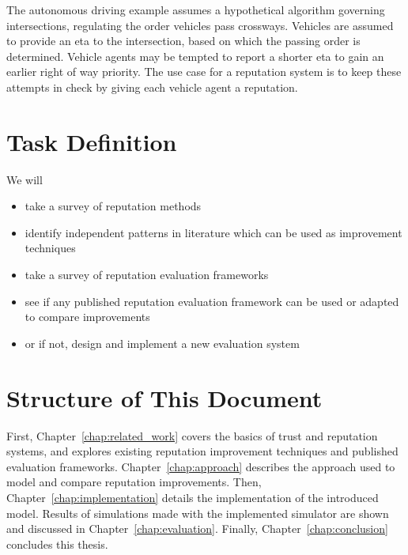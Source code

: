 \documentclass[%
    ]{\PathToTumTemplate/thesis/tum_thesis}
\begin{document}
The autonomous driving example assumes a hypothetical algorithm governing intersections, regulating the order vehicles pass crossways.
Vehicles are assumed to provide an \gls{eta} to the intersection, based on which the passing order is determined.
Vehicle agents may be tempted to report a shorter \gls{eta} to gain an earlier right of way priority.
The use case for a reputation system is to keep these attempts in check by giving each vehicle agent a reputation.




\section{Task Definition}

We will

\begin{itemize}
    \item take a survey of reputation methods
    \item identify independent patterns in literature which can be used as improvement techniques
    \item take a survey of reputation evaluation frameworks
    \item see if any published reputation evaluation framework can be used or adapted to compare improvements
    \item or if not, design and implement a new evaluation system
\end{itemize}



\section{Structure of This Document}

First, Chapter~\ref{chap:related_work} covers the basics of trust and reputation systems, and explores existing reputation improvement techniques and published evaluation frameworks.
Chapter~\ref{chap:approach} describes the approach used to model and compare reputation improvements.
Then, Chapter~\ref{chap:implementation} details the implementation of the introduced model.
Results of simulations made with the implemented simulator are shown and discussed in Chapter~\ref{chap:evaluation}.
Finally, Chapter~\ref{chap:conclusion} concludes this thesis.
\end{document}
